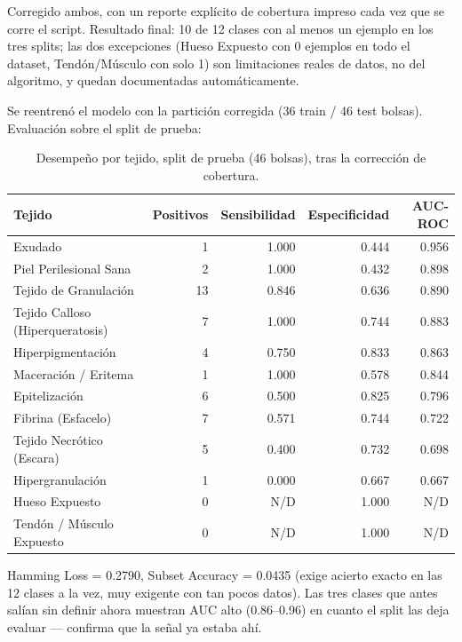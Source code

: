 \documentclass[12pt,letterpaper]{report}
\begin{document}
Corregido ambos, con un reporte explícito de cobertura impreso cada vez que se corre el script.
Resultado final: 10 de 12 clases con al menos un ejemplo en los tres splits; las dos excepciones
(Hueso Expuesto con 0 ejemplos en todo el dataset, Tendón/Músculo con solo 1) son limitaciones
reales de datos, no del algoritmo, y quedan documentadas automáticamente.

Se reentrenó el modelo con la partición corregida (36 train / 46 test bolsas). Evaluación sobre el
split de prueba:

\begin{table}[H]
\centering
\caption{Desempeño por tejido, split de prueba (46 bolsas), tras la corrección de cobertura.}
\begin{tabular}{lrrrr}
\toprule
Tejido & Positivos & Sensibilidad & Especificidad & AUC-ROC \\
\midrule
Exudado                          & 1  & 1.000 & 0.444 & 0.956 \\
Piel Perilesional Sana           & 2  & 1.000 & 0.432 & 0.898 \\
Tejido de Granulación            & 13 & 0.846 & 0.636 & 0.890 \\
Tejido Calloso (Hiperqueratosis) & 7  & 1.000 & 0.744 & 0.883 \\
Hiperpigmentación                & 4  & 0.750 & 0.833 & 0.863 \\
Maceración / Eritema             & 1  & 1.000 & 0.578 & 0.844 \\
Epitelización                    & 6  & 0.500 & 0.825 & 0.796 \\
Fibrina (Esfacelo)               & 7  & 0.571 & 0.744 & 0.722 \\
Tejido Necrótico (Escara)        & 5  & 0.400 & 0.732 & 0.698 \\
Hipergranulación                 & 1  & 0.000 & 0.667 & 0.667 \\
Hueso Expuesto                   & 0  & N/D   & 1.000 & N/D \\
Tendón / Músculo Expuesto        & 0  & N/D   & 1.000 & N/D \\
\bottomrule
\end{tabular}
\end{table}

Hamming Loss = 0.2790, Subset Accuracy = 0.0435 (exige acierto exacto en las 12 clases a la vez,
muy exigente con tan pocos datos). Las tres clases que antes salían sin definir ahora muestran AUC
alto (0.86--0.96) en cuanto el split las deja evaluar --- confirma que la señal ya estaba ahí.
\end{document}
